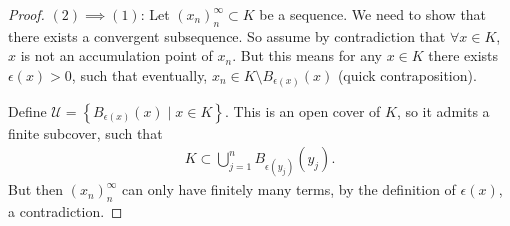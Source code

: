 \begin{proof}
	$(2) \implies (1)$: Let $(x_{n})_{n}^{\infty} \subset K$ be a sequence. We need to show that there exists a convergent subsequence. So assume by contradiction that $\forall x \in K$, $x$ is not an accumulation point of $x_{n}$. But this means for any $x \in K$ there exists $\epsilon(x) > 0$, such that eventually, $x_{n} \in K \setminus B_{\epsilon(x)}(x)$ (quick contraposition). 

	Define $\mathcal{U} = \left\{ B_{\epsilon(x)}(x) \mid x \in K \right\}$. This is an open cover of $K$, so it admits a finite subcover, such that
	\begin{align*}
		K \subset \bigcup_{j=1}^{n} B_{\epsilon(y_{j})}(y_{j}).
	\end{align*}
	But then $(x_{n})_{n}^{\infty}$ can only have finitely many terms, by the definition of $\epsilon(x)$, a contradiction.
\end{proof}

